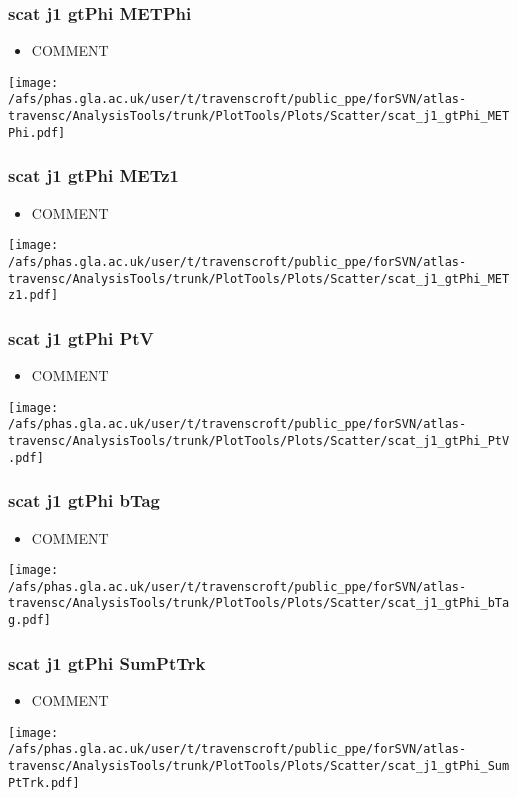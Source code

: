 \documentclass{beamer}
\begin{document}
\begin{frame}
\frametitle{scat j1 gtPhi METPhi}
\begin{itemize}
\item COMMENT
\end{itemize}
\begin{center}
\texttt{[image: /afs/phas.gla.ac.uk/user/t/travenscroft/public\_ppe/forSVN/atlas-travensc/AnalysisTools/trunk/PlotTools/Plots/Scatter/scat\_j1\_gtPhi\_METPhi.pdf]}
\end{center}
\end{frame}

\begin{frame}
\frametitle{scat j1 gtPhi METz1}
\begin{itemize}
\item COMMENT
\end{itemize}
\begin{center}
\texttt{[image: /afs/phas.gla.ac.uk/user/t/travenscroft/public\_ppe/forSVN/atlas-travensc/AnalysisTools/trunk/PlotTools/Plots/Scatter/scat\_j1\_gtPhi\_METz1.pdf]}
\end{center}
\end{frame}

\begin{frame}
\frametitle{scat j1 gtPhi PtV}
\begin{itemize}
\item COMMENT
\end{itemize}
\begin{center}
\texttt{[image: /afs/phas.gla.ac.uk/user/t/travenscroft/public\_ppe/forSVN/atlas-travensc/AnalysisTools/trunk/PlotTools/Plots/Scatter/scat\_j1\_gtPhi\_PtV.pdf]}
\end{center}
\end{frame}

\begin{frame}
\frametitle{scat j1 gtPhi bTag}
\begin{itemize}
\item COMMENT
\end{itemize}
\begin{center}
\texttt{[image: /afs/phas.gla.ac.uk/user/t/travenscroft/public\_ppe/forSVN/atlas-travensc/AnalysisTools/trunk/PlotTools/Plots/Scatter/scat\_j1\_gtPhi\_bTag.pdf]}
\end{center}
\end{frame}

\begin{frame}
\frametitle{scat j1 gtPhi SumPtTrk}
\begin{itemize}
\item COMMENT
\end{itemize}
\begin{center}
\texttt{[image: /afs/phas.gla.ac.uk/user/t/travenscroft/public\_ppe/forSVN/atlas-travensc/AnalysisTools/trunk/PlotTools/Plots/Scatter/scat\_j1\_gtPhi\_SumPtTrk.pdf]}
\end{center}
\end{frame}
\end{document}
